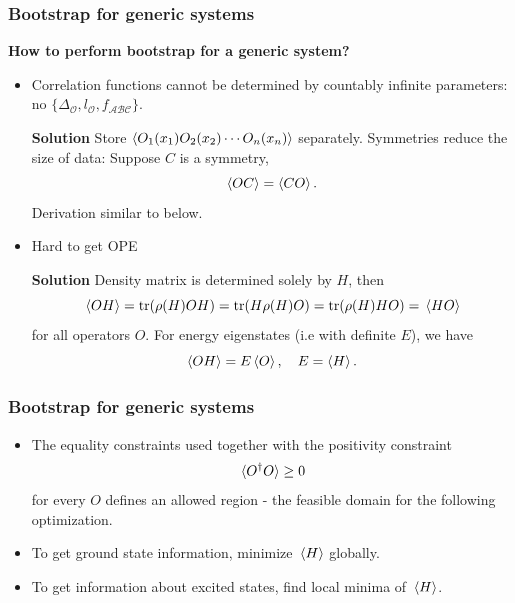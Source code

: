 \documentclass{beamer}
\begin{document}
\begin{frame}
\frametitle{Bootstrap for generic systems}

\textbf{How to perform bootstrap for a generic system?}    

\begin{itemize}
    \item Correlation functions cannot be determined by countably infinite parameters: 
    no $\{\Delta_{\mathcal{O}}, l_{\mathcal{O}}, f_{\mathcal{A} \mathcal{B} \mathcal{C}}\}$.
    
    \textbf{Solution} Store $\expval{O_1(x_1) O_2(x_2) \cdots O_n (x_n)}$ separately. Symmetries reduce the size 
    of data: Suppose $C$ is a symmetry, 
    \begin{equation}
        \expval{OC} = \expval{CO}.
    \end{equation}
    Derivation similar to below.
    
    \item Hard to get OPE
    
    \textbf{Solution} Density matrix is determined solely by $H$, then 
    \begin{equation}
        \expval*{O H} = \trace (\rho(H) O H) = \trace(H \rho(H) O) = \trace(\rho(H) H O)  = \expval*{H {O}}
    \end{equation}
    for all operators $O$. For energy eigenstates (i.e with definite $E$), we have 
    \begin{equation}
        \expval{O H} = E \expval{O}, \quad E = \expval{H}.
    \end{equation}
\end{itemize}

\end{frame}

\begin{frame}
\frametitle{Bootstrap for generic systems}

\begin{itemize}
    \item The equality constraints used together with the positivity constraint 
    \begin{equation}
        \expval*{O^\dagger O} \geq 0
    \end{equation}
    for every $O$ defines an allowed region - the feasible domain for the following optimization.
    \item To get ground state information, minimize $\expval*{H}$ globally.
    \item To get information about excited states, find local minima of $\expval*{H}$.
\end{itemize} 

\begin{center}
    
\end{center}

\end{frame}
\end{document}

